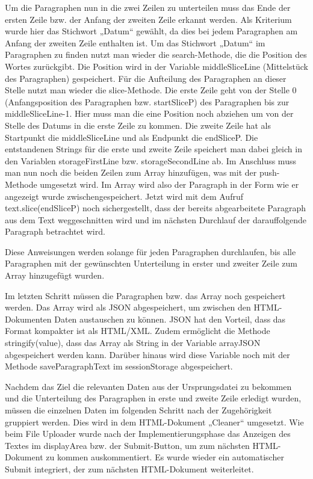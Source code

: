 Um die Paragraphen nun in die zwei Zeilen zu unterteilen muss das Ende der ersten Zeile bzw. der Anfang der zweiten Zeile erkannt werden. Als Kriterium wurde hier das Stichwort „Datum“ gewählt, da dies bei jedem Paragraphen am Anfang der zweiten Zeile enthalten ist. Um das Stichwort „Datum“ im Paragraphen zu finden nutzt man wieder die search-Methode, die die Position des Wortes zurückgibt. Die Position wird in der Variable middleSliceLine (Mittelstück des Paragraphen) gespeichert. Für die Aufteilung des Paragraphen an dieser Stelle nutzt man wieder die slice-Methode. Die erste Zeile geht von der Stelle 0 (Anfangsposition des Paragraphen bzw. startSliceP) des Paragraphen bis zur middleSliceLine-1. Hier muss man die eine Position noch abziehen um von der Stelle des Datums in die erste Zeile zu kommen. Die zweite Zeile hat als Startpunkt die middleSliceLine und als Endpunkt die endSliceP. Die entstandenen Strings für die erste und zweite Zeile speichert man dabei gleich in den Variablen storageFirstLine bzw. storageSecondLine ab. Im Anschluss muss man nun noch die beiden Zeilen zum Array hinzufügen, was mit der push-Methode umgesetzt wird. Im Array wird also der Paragraph in der Form wie er angezeigt wurde zwischengespeichert. Jetzt wird mit dem Aufruf text.slice(endSliceP) noch sichergestellt, dass der bereits abgearbeitete Paragraph aus dem Text weggeschnitten wird und im nächsten Durchlauf der darauffolgende Paragraph betrachtet wird.

Diese Anweisungen werden solange für jeden Paragraphen durchlaufen, bis alle Paragraphen mit der gewünschten Unterteilung in erster und zweiter Zeile zum Array hinzugefügt wurden.

Im letzten Schritt müssen die Paragraphen bzw. das Array noch gespeichert werden. Das Array wird als \ac{JSON} abgespeichert, um zwischen den HTML-Dokumenten Daten austauschen zu können. JSON hat den Vorteil, dass das Format kompakter ist als HTML/XML. Zudem ermöglicht die Methode stringify(value), dass das Array als String in der Variable arrayJSON abgespeichert werden kann. Darüber hinaus wird diese Variable noch mit der Methode saveParagraphText im sessionStorage abgespeichert.


Nachdem das Ziel die relevanten Daten aus der Ursprungsdatei zu bekommen und die Unterteilung des Paragraphen in erste und zweite Zeile erledigt wurden, müssen die einzelnen Daten im folgenden Schritt nach der Zugehörigkeit gruppiert werden. Dies wird in dem HTML-Dokument „Cleaner“ umgesetzt. Wie beim File Uploader wurde nach der Implementierungsphase das Anzeigen des Textes im displayArea bzw. der Submit-Button, um zum nächsten HTML-Dokument zu kommen auskommentiert. Es wurde wieder ein automatischer Submit integriert, der zum nächsten HTML-Dokument weiterleitet.



